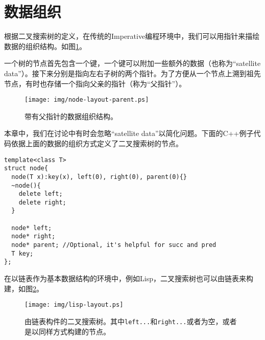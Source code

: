 \documentclass[UTF8]{article}
\begin{document}
\section{数据组织}

根据二叉搜索树的定义，在传统的Imperative编程环境中，我们可以用指针来描绘数据的组织结构。如图\ref{fig:node-layout-parent}。


一个树的节点首先包含一个键，一个键可以附加一些额外的数据（也称为“satellite data”）。接下来分别是指向左右子树的两个指针。为了方便从一个节点上溯到祖先节点，有时也存储一个指向父亲的指针（称为“父指针”）。

\begin{figure}[htbp]
  \centering
  \texttt{[image: img/node-layout-parent.ps]}
  \caption{带有父指针的数据组织结构。} \label{fig:node-layout-parent}
\end{figure}

本章中，我们在讨论中有时会忽略“satellite data”以简化问题。下面的C++例子代码依据上面的数据的组织方式定义了二叉搜索树的节点。

\lstset{language=C++}
\begin{lstlisting}
template<class T>
struct node{
  node(T x):key(x), left(0), right(0), parent(0){}
  ~node(){
    delete left;
    delete right;
  }

  node* left;
  node* right;
  node* parent; //Optional, it's helpful for succ and pred
  T key;
};
\end{lstlisting}

在以链表作为基本数据结构的环境中，例如Lisp，二叉搜索树也可以由链表来构建，如图\ref{fig:lisp-layout}。

\begin{figure}[htbp]
  \centering
  \texttt{[image: img/lisp-layout.ps]}
  \caption{由链表构件的二叉搜索树。其中\texttt{left...}和\texttt{right...}或者为空，或者是以同样方式构建的节点。}
  \label{fig:lisp-layout}
\end{figure}
\end{document}

